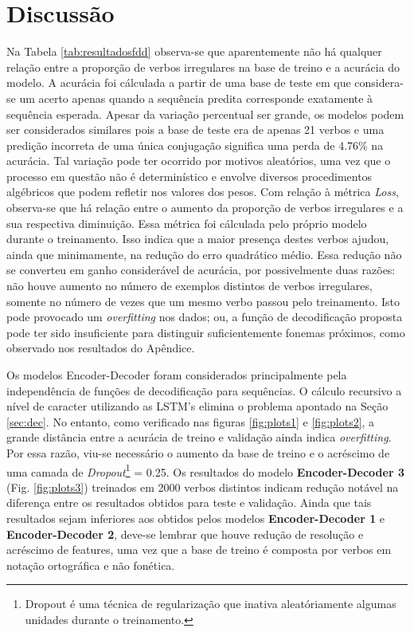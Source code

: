 \section{Discussão}
\label{sec:disc}

Na Tabela \ref{tab:resultadosfdd} observa-se que aparentemente não há qualquer relação entre a proporção de verbos irregulares na base de treino e a acurácia do modelo. A acurácia foi cálculada a partir de uma base de teste em que considera-se um acerto apenas quando a sequência predita corresponde exatamente à sequência esperada. Apesar da variação percentual ser grande, os modelos podem ser considerados similares pois a base de teste era de apenas 21 verbos e uma predição incorreta de uma única conjugação significa uma perda de 4.76\% na acurácia. Tal variação pode ter ocorrido por motivos aleatórios, uma vez que o processo em questão não é determinístico e envolve diversos procedimentos algébricos que podem refletir nos valores dos pesos. Com relação à métrica \textit{Loss}, observa-se que há relação entre o aumento da proporção de verbos irregulares e a sua respectiva diminuição. Essa métrica foi cálculada pelo próprio modelo durante o treinamento. Isso indica que a maior presença destes verbos ajudou, ainda que minimamente, na redução do erro quadrático médio. Essa redução não se converteu em ganho considerável de acurácia, por possivelmente duas razões: não houve aumento no número de exemplos distintos de verbos irregulares, somente no número de vezes que um mesmo verbo passou pelo treinamento. Isto pode provocado um \textit{overfitting} nos dados; ou, a função de decodificação proposta pode ter sido insuficiente para distinguir suficientemente fonemas próximos, como observado nos resultados do Apêndice. %

Os modelos Encoder-Decoder foram considerados principalmente pela independência de funções de decodificação para sequências. O cálculo recursivo a nível de caracter utilizando as LSTM's elimina o problema apontado na Seção \ref{sec:dec}. No entanto, como verificado nas figuras \ref{fig:plots1} e \ref{fig:plots2}, a grande distância entre a acurácia de treino e validação ainda indica \textit{overfitting}. Por essa razão, viu-se necessário o aumento da base de treino e o acréscimo de uma camada de \textit{Dropout}\footnote{Dropout é uma técnica de regularização que inativa aleatóriamente algumas unidades durante o treinamento. %
} = 0.25. Os resultados do modelo \textbf{Encoder-Decoder 3} (Fig. \ref{fig:plots3}) treinados em 2000 verbos distintos indicam redução notável na diferença entre os resultados obtidos para teste e validação. Ainda que tais resultados sejam inferiores aos obtidos pelos modelos \textbf{Encoder-Decoder 1} e \textbf{Encoder-Decoder 2}, deve-se lembrar que houve redução de resolução e acréscimo de features, uma vez que a base de treino é composta por verbos em notação ortográfica e não fonética. 

